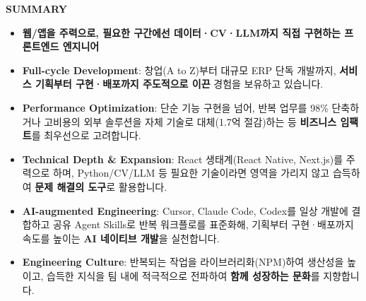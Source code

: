 \documentclass[a4paper, 11pt]{article}
\newcommand{\csection}[2]{
    \vspace{12pt}
    {\Large\textbf{#1}} \hrulefill \\ \vspace{3pt}
    #2
}
\begin{document}
\csection{SUMMARY}{
    \begin{itemize}[leftmargin=*, noitemsep]
        \item[] \textbf{웹/앱을 주력으로, 필요한 구간에선 데이터·CV·LLM까지 직접 구현하는 프론트엔드 엔지니어} \\
        \item \textbf{Full-cycle Development}: 창업(A to Z)부터 대규모 ERP 단독 개발까지, \textbf{서비스 기획부터 구현·배포까지 주도적으로 이끈} 경험을 보유하고 있습니다.
        \item \textbf{Performance Optimization}: 단순 기능 구현을 넘어, 반복 업무를 98\% 단축하거나 고비용의 외부 솔루션을 자체 기술로 대체(1.7억 절감)하는 등 \textbf{비즈니스 임팩트}를 최우선으로 고려합니다.
        \item \textbf{Technical Depth \& Expansion}: React 생태계(React Native, Next.js)를 주력으로 하며, Python/CV/LLM 등 필요한 기술이라면 영역을 가리지 않고 습득하여 \textbf{문제 해결의 도구}로 활용합니다.
        \item \textbf{AI-augmented Engineering}: Cursor, Claude Code, Codex를 일상 개발에 결합하고 공유 Agent Skills로 반복 워크플로를 표준화해, 기획부터 구현·배포까지 속도를 높이는 \textbf{AI 네이티브 개발}을 실천합니다.
        \item \textbf{Engineering Culture}: 반복되는 작업을 라이브러리화(NPM)하여 생산성을 높이고, 습득한 지식을 팀 내에 적극적으로 전파하여 \textbf{함께 성장하는 문화}를 지향합니다.
    \end{itemize}
}
\end{document}
